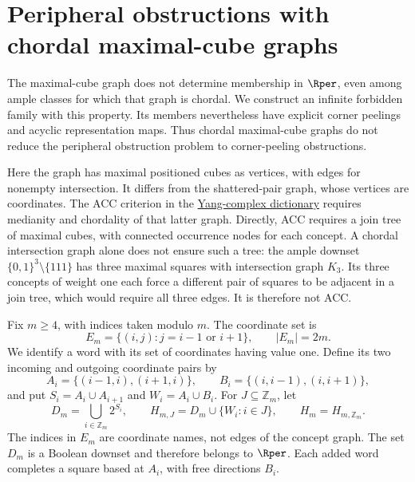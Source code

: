 \section{Peripheral obstructions with chordal maximal-cube graphs}
\label{sec:rper-chordal-sun-obstructions}

The maximal-cube graph does not determine membership in $\Rper$, even
among ample classes for which that graph is chordal. We construct an
infinite forbidden family with this property. Its members nevertheless
have explicit corner peelings and acyclic representation maps. Thus
chordal maximal-cube graphs do not reduce the peripheral obstruction
problem to corner-peeling obstructions.

Here the graph has maximal positioned cubes as vertices, with edges for
nonempty intersection. It differs from the shattered-pair graph, whose
vertices are coordinates. The ACC criterion in the
\href{../../../YangDim/yang_complex_dictionary.tex}{Yang-complex dictionary}
requires medianity and chordality of that latter graph. Directly, ACC
requires a join tree of maximal cubes, with connected occurrence nodes for
each concept. A chordal intersection graph alone does not ensure such a
tree: the ample downset $\{0,1\}^3\setminus\{111\}$ has three maximal
squares with intersection graph $K_3$. Its three concepts of weight one
each force a different pair of squares to be adjacent in a join tree,
which would require all three edges. It is therefore not ACC.

Fix $m\ge4$, with indices taken modulo $m$. The coordinate set is
\[
 E_m=\{(i,j):j=i-1\text{ or }i+1\},\qquad |E_m|=2m.
\]
We identify a word with its set of coordinates having value one. Define
its two incoming and outgoing coordinate pairs by
\[
 A_i=\{(i-1,i),(i+1,i)\},\qquad
 B_i=\{(i,i-1),(i,i+1)\},
\]
and put $S_i=A_i\cup A_{i+1}$ and $W_i=A_i\cup B_i$.
For $J\subseteq\mathbb Z_m$, let
\begin{equation}
 D_m=\bigcup_{i\in\mathbb Z_m}2^{S_i},\qquad
 H_{m,J}=D_m\cup\{W_i:i\in J\},\qquad H_m=H_{m,\mathbb Z_m}.
 \label{eq:rper-sun-family}
\end{equation}
The indices in $E_m$ are coordinate names, not edges of the concept graph.
The set $D_m$ is a Boolean downset and therefore belongs to $\Rper$.
Each added word completes a square based at $A_i$, with free directions
$B_i$.

